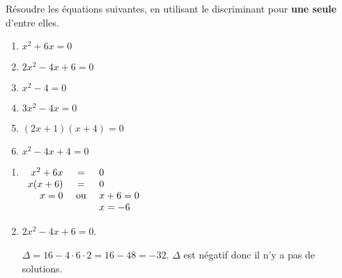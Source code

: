 \begin{exo}[type=solution]
 Résoudre les équations suivantes, en utilisant le discriminant pour \textbf{une seule} d'entre elles.
	
	\begin{multicols}{2}
	\begin{enumerate}[label=\bf{\alph*})\,]
		\item $x^2+6x=0$
		
		\item $2x^2-4x+6 = 0$
		
		\item $x^2-4=0$
		
		\item $3x^2-4x=0$
		
		\item $(2x+1)(x+4)=0$
		
		\item $x^2-4x+4=0$
		
	\end{enumerate}	
	\end{multicols}


\begin{sol}
\begin{enumerate}[label=\bf{\alph*})\,]
\item 
$
\begin{array}[t]{rcl}
x^2+6x &  = & 0 \\ 
x(x+6) & = & 0  \\
 x=0  & \text{ ou }& x+6=0 \\
  & & x=-6 \\
\end{array}
$
\item 
$2x^2-4x+6 = 0$.

$\Delta = 16-4 \cdot 6 \cdot 2 = 16-48 = -32$.  $\Delta$ est négatif donc il n'y a pas de solutions.


\end{enumerate}
\end{sol}
\end{exo}
